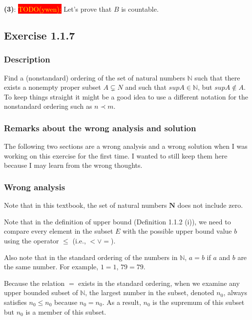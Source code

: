 \documentclass[12pt, letterpaper, oneside]{book}
\begin{document}
\textbf{(3)}: \colorbox{red}{\textcolor{yellow}{TODO(ywen):}} Let's prove that $B$ is countable.

\subsection{Exercise 1.1.7}

\subsubsection{Description}

Find a (nonstandard) ordering of the set of natural numbers $\mathbb{N}$ such that there exists a nonempty proper
subset $A \subsetneq N$ and such that $sup A \in \mathbb{N}$, but $sup A \notin A$. To keep things straight it might be
a good idea to use a different notation for the nonstandard ordering such as $n \prec m$.

\subsubsection{Remarks about the wrong analysis and solution}

The following two sections are a wrong analysis and a wrong solution when I was working on this exercise for the first
time. I wanted to still keep them here because I may learn from the wrong thoughts.

\subsubsection{Wrong analysis}

Note that in this textbook, the set of natural numbers $\mathbf{N}$ does not include zero.

Note that in the definition of upper bound (Definition 1.1.2 (i)), we need to compare every element in the subset $E$
with the possible upper bound value $b$ using the operator $\le$ (i.e., $< \lor =$).

Also note that in the standard ordering of the numbers in $\mathbb{N}$, $a = b$ if $a$ and $b$ are the same number. For
example, $1 = 1$, $79 = 79$.

Because the relation $=$ exists in the standard ordering, when we examine any upper bounded subset of $\mathbb{N}$, the
largest number in the subset, denoted $n_0$, always satisfies $n_0 \le n_0$ because $n_0 = n_0$. As a result, $n_0$ is
the supremum of this subset but $n_0$ is a member of this subset.
\end{document}
